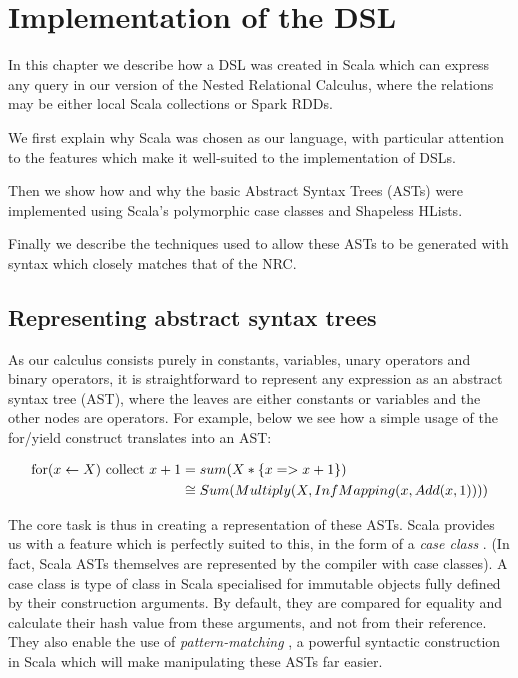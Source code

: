 \chapter{Implementation of the DSL}

In this chapter we describe how a DSL was created in Scala which can express any query in our version of the Nested Relational Calculus, where the relations may be either local Scala collections or Spark RDDs.

We first explain why Scala was chosen as our language, with particular attention to the features which make it well-suited to the implementation of DSLs.

Then we show how and why the basic Abstract Syntax Trees (ASTs) were implemented using Scala's polymorphic case classes and Shapeless HLists.

Finally we describe the techniques used to allow these ASTs to be generated with syntax which closely matches that of the NRC.

\section{Representing abstract syntax trees}

As our calculus consists purely in constants, variables, unary operators and binary operators, it is straightforward to represent any expression as an abstract syntax tree (AST), where the leaves are either constants or variables and the other nodes are operators. For example, below we see how a simple usage of the for/yield construct translates into an AST:

\begin{equation*}
\begin{split}
\textrm{for}(x \leftarrow X) \textrm{ collect } x + 1 &= sum(X*\{x => x + 1\}) \\
&\cong Sum(Multiply(X,InfMapping(x,Add(x,1))))
\end{split}
\end{equation*}

The core task is thus in creating a representation of these ASTs. Scala provides us with a feature which is perfectly suited to this, in the form of a \textit{case class} \cite{caseclass}. (In fact, Scala ASTs themselves are represented by the compiler with case classes\cite{compilerasts}). A case class is type of class in Scala specialised for immutable objects fully defined by their construction arguments. By default, they are compared for equality and calculate their hash value from these arguments, and not from their reference. They also enable the use of \textit{pattern-matching} \cite{patternmatch}, a powerful syntactic construction in Scala which will make manipulating these ASTs far easier.


